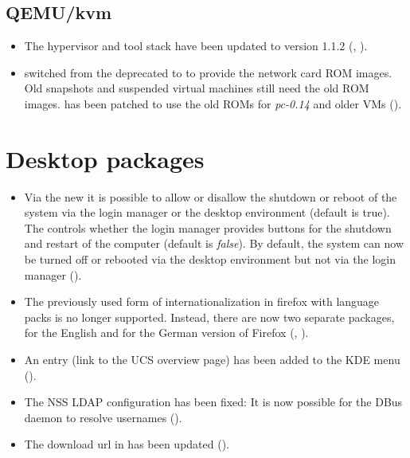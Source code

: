 \subsection{QEMU/kvm}
\begin{itemize}
\item The  hypervisor and tool stack have been
  updated to version 1.1.2 (, ).
\item {} switched from the deprecated
   to  to provide the network
  card ROM images. Old snapshots and suspended virtual machines still
  need the old ROM images.  has been patched to use
  the old  ROMs for \emph{pc-0.14} and older
  VMs ().
\end{itemize}


\section{Desktop packages}
\begin{itemize}

\item Via the new  it is possible to allow or
disallow the shutdown or reboot of the system via the login manager
 or the desktop environment  (default is
true). The  controls whether the login manager
provides buttons for the shutdown and restart of the computer (default
is \emph{false}). By default, the system can now be turned off or rebooted via
the desktop environment but not via the login manager ().

\item The previously used form of internationalization
in firefox with language packs is no longer supported. Instead, there
are now two separate packages,  for the English
and  for the German version of Firefox (, ).

\item An entry  (link to the
UCS overview page) has been added to the KDE menu ().

\item The NSS LDAP configuration has been fixed: It is now
possible for the DBus daemon to resolve usernames ().

\item The download url in  has been updated ().
\end{itemize}


